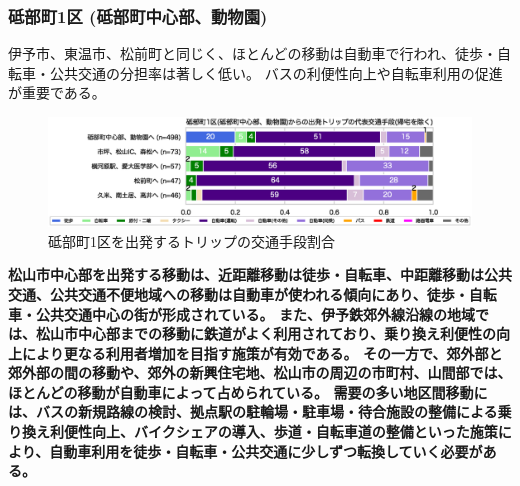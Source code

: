 \documentclass[a4paper,12pt, uplatex]{jsbook}
\begin{document}
\subsubsection{砥部町1区 (砥部町中心部、動物園)}
伊予市、東温市、松前町と同じく、ほとんどの移動は自動車で行われ、徒歩・自転車・公共交通の分担率は著しく低い。
バスの利便性向上や自転車利用の促進が重要である。
%
\begin{figure}[H]
    \centering
    \includegraphics[width=1.0\textwidth]{picture/mode_share_砥部町1区.eps}
    \caption{砥部町1区を出発するトリップの交通手段割合}
    \label{fig:mode_share_tobe1}
\end{figure}


\color{red}
\begin{framed}
\noindent
\textbf{\large 松山市中心部を出発する移動は、近距離移動は徒歩・自転車、中距離移動は公共交通、公共交通不便地域への移動は自動車が使われる傾向にあり、徒歩・自転車・公共交通中心の街が形成されている。
また、伊予鉄郊外線沿線の地域では、松山市中心部までの移動に鉄道がよく利用されており、乗り換え利便性の向上により更なる利用者増加を目指す施策が有効である。
その一方で、郊外部と郊外部の間の移動や、郊外の新興住宅地、松山市の周辺の市町村、山間部では、ほとんどの移動が自動車によって占められている。
需要の多い地区間移動には、バスの新規路線の検討、拠点駅の駐輪場・駐車場・待合施設の整備による乗り換え利便性向上、バイクシェアの導入、歩道・自転車道の整備といった施策により、自動車利用を徒歩・自転車・公共交通に少しずつ転換していく必要がある。
}
\end{framed}
\color{black}


\clearpage
\end{document}
